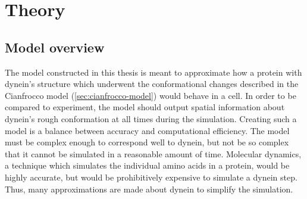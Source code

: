 \documentclass[
11pt, %
english, %
singlespacing, %
headsepline, %
chapterinoneline, %
]{MastersDoctoralThesis} %
\begin{document}

\newpage
\chapter{Theory}
\label{chap:Theory}

\section{Model overview}
The model constructed in this thesis is meant to approximate how a protein with dynein's structure which underwent the conformational changes described in the Cianfrocco model (\ref{sec:cianfrocco-model}) would behave in a cell. In order to be compared to experiment, the model should output spatial information about dynein's rough conformation at all times during the simulation. Creating such a model is a balance between accuracy and computational efficiency. The model must be complex enough to correspond well to dynein, but not be so complex that it cannot be simulated in a reasonable amount of time. Molecular dynamics, a technique which simulates the individual amino acids in a protein, would be highly accurate, but would be prohibitively expensive to simulate a dynein step. Thus, many approximations are made about dynein to simplify the simulation.\\
\end{document}
